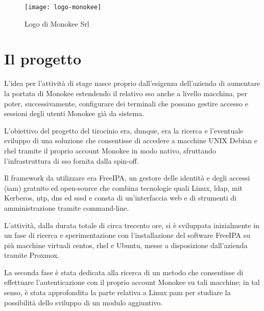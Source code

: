 \begin{figure}[!h] 
    \centering 
    \texttt{[image: logo-monokee]} 
    \caption{Logo di Monokee Srl}
    \label{fig:monokee}
\end{figure}
    

\section{Il progetto}

L'idea per l'attività di stage nasce proprio dall'esigenza dell'azienda di aumentare la portata di Monokee estendendo il 
relativo \acrshort{sso} anche a livello macchina, per poter, successivamente, configurare dei terminali
che possano gestire accesso e sessioni degli utenti Monokee già da sistema.

L'obiettivo del progetto del tirocinio era, dunque, era la ricerca e l'eventuale sviluppo di una soluzione che consentisse
di accedere a macchine UNIX Debian e \acrfull{rhel} tramite il proprio account Monokee in modo nativo, sfruttando l'infrastruttura
di \acrshort{sso} fornita dalla spin-off.

Il framework da utilizzare era FreeIPA, un gestore delle identità e degli accessi (\acrshort{iam})
gratuito ed open-source che combina tecnologie quali Linux, \acrfull{ldap}, \acrfull{mit} Kerberos, \acrfull{ntp}, \acrfull{dns} ed \acrfull{sssd} e consta di un'interfaccia web
e di strumenti di amministrazione tramite command-line\cite{site:freeipa-website}. 

L'attività, dalla durata totale di circa trecento ore, si è sviluppata inizialmente in un fase di ricerca e sperimentazione
con l'installazione del software FreeIPA su più macchine virtuali \acrfull{centos}, \acrfull{rhel} e Ubuntu,
messe a disposizione dall'azienda tramite Proxmox.

La seconda fase è stata dedicata alla ricerca di un metodo che consentisse di effettuare l'autenticazione con il
proprio account Monokee su tali macchine; in tal senso, è stata approfondita la parte relativa a 
Linux \acrshort{pam} per studiare la possibilità dello sviluppo di un modulo aggiuntivo. 

